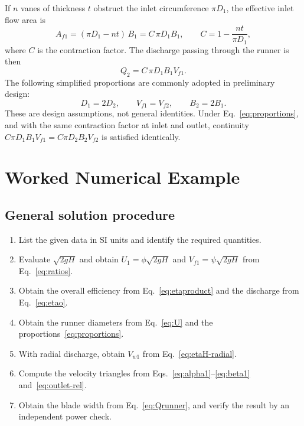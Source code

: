 \documentclass[11pt,a4paper]{article}
\numberwithin{equation}{section}
\begin{document}
If $n$ vanes of thickness $t$ obstruct the inlet circumference $\pi D_1$, the effective inlet flow area is
\begin{equation}
  A_{f1} = (\pi D_1 - n t)\,B_1 = C\,\pi D_1 B_1, \qquad C = 1 - \frac{n t}{\pi D_1},
  \label{eq:area}
\end{equation}
where $C$ is the contraction factor. The discharge passing through the runner is then
\begin{equation}
  Q_2 = C\,\pi D_1 B_1 V_{f1}.
  \label{eq:Qrunner}
\end{equation}
The following simplified proportions are commonly adopted in preliminary design:
\begin{equation}
  D_1 = 2D_2, \qquad V_{f1} = V_{f2}, \qquad B_2 = 2B_1 .
  \label{eq:proportions}
\end{equation}
These are design assumptions, not general identities. Under Eq.~\eqref{eq:proportions}, and with the same contraction factor at inlet and outlet, continuity $C\pi D_1 B_1 V_{f1} = C\pi D_2 B_2 V_{f2}$ is satisfied identically.

\section{Worked Numerical Example}
\label{sec:example}

\subsection{General solution procedure}

\begin{enumerate}[nosep]
  \item List the given data in SI units and identify the required quantities.
  \item Evaluate $\sqrt{2gH}$ and obtain $U_1 = \phi\sqrt{2gH}$ and $V_{f1} = \psi\sqrt{2gH}$ from Eq.~\eqref{eq:ratios}.
  \item Obtain the overall efficiency from Eq.~\eqref{eq:etaproduct} and the discharge from Eq.~\eqref{eq:etao}.
  \item Obtain the runner diameters from Eq.~\eqref{eq:U} and the proportions~\eqref{eq:proportions}.
  \item With radial discharge, obtain $V_{w1}$ from Eq.~\eqref{eq:etaH-radial}.
  \item Compute the velocity triangles from Eqs.~\eqref{eq:alpha1}--\eqref{eq:beta1} and~\eqref{eq:outlet-rel}.
  \item Obtain the blade width from Eq.~\eqref{eq:Qrunner}, and verify the result by an independent power check.
\end{enumerate}
\end{document}
